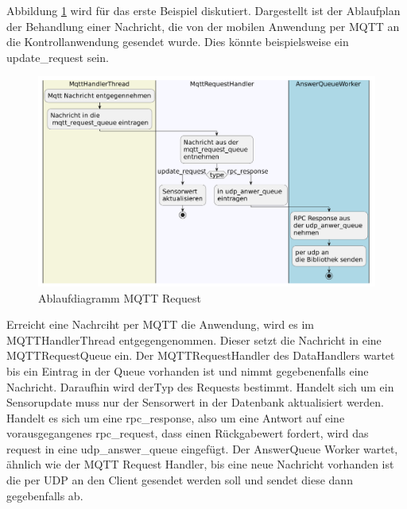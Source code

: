 \documentclass[11pt,a4paper]{report}
\begin{document}
Abbildung \ref{fig:serverMqttReqPath} wird für das erste Beispiel diskutiert.
Dargestellt ist der Ablaufplan der Behandlung einer Nachricht, die von der mobilen Anwendung per MQTT an die Kontrollanwendung gesendet wurde.
Dies könnte beispielsweise ein update\_request sein.
\begin{figure}[htbp]
  \centering
  \includegraphics[width=\textwidth]{images/MqttRequestServerPath}
  \caption{Ablaufdiagramm MQTT Request}
  \label{fig:serverMqttReqPath}
\end{figure}
Erreicht eine Nachrciht per MQTT die Anwendung, wird es im MQTTHandlerThread entgegengenommen.
Dieser setzt die Nachricht in eine MQTTRequestQueue ein.
Der MQTTRequestHandler des DataHandlers wartet bis ein Eintrag in der Queue vorhanden ist und nimmt gegebenenfalls eine Nachricht.
Daraufhin wird derTyp des Requests bestimmt.
Handelt sich um ein Sensorupdate muss nur der Sensorwert in der Datenbank aktualisiert werden.
Handelt es sich um eine rpc\_response, also um eine Antwort auf eine vorausgegangenes rpc\_request, dass einen Rückgabewert fordert, wird das request in eine udp\_answer\_queue eingefügt.
Der AnswerQueue Worker wartet, ähnlich wie der MQTT Request Handler, bis eine neue Nachricht vorhanden ist die per UDP an den Client gesendet werden soll und sendet diese dann gegebenfalls ab.
\end{document}

